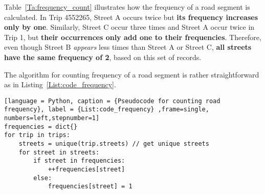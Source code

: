 \begin{table}[h]
\centering
{}
\caption{An illustration of frequency counting}\label{Ta:frequency_count}
\end{table}

Table~\ref{Ta:frequency_count} illustrates how the frequency of a road segment is calculated. In Trip 4552265, Street A occurs twice but \textbf{its frequency increases only by one}. Similarly, Street C occur three times and Street A occur twice in Trip 1, but \textbf{their occurrences only add one to their frequencies}. Therefore, even though Street B \emph{appears} less times than Street A or Street C, \textbf{all streets have the same frequency of 2}, based on this set of records.  

The algorithm for counting frequency of a road segment is rather straightforward as in Listing~\ref{List:code_frequency}.

\begin{lstlisting}[language = Python, caption = {Pseudocode for counting road frequency}, label = {List:code_frequency} ,frame=single, numbers=left,stepnumber=1]
frequencies = dict{}
for trip in trips:
	streets = unique(trip.streets) // get unique streets
	for street in streets:
		if street in frequencies:
			++frequencies[street]
		else:
			frequencies[street] = 1
\end{lstlisting}

